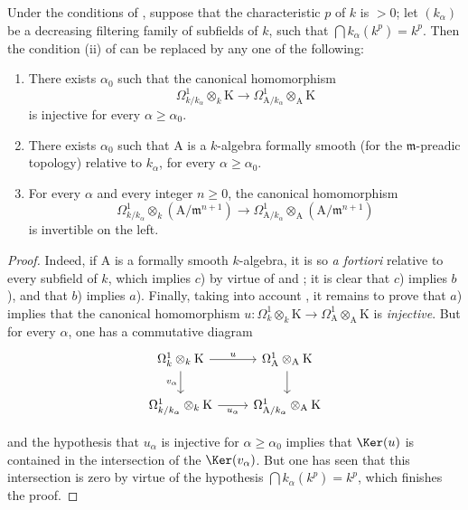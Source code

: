 \begin{proposition}[22.2.8]
\label{0.22.2.8}
Under the conditions of , suppose that the characteristic $p$ of $k$ is $>0$; let $(k_\alpha)$ be a decreasing filtering family of subfields of $k$, such that $\bigcap k_\alpha(k^p)=k^p$.
Then the condition (ii) of  can be replaced by any one of the following:
\begin{enumerate}
  \item[a)] There exists $\alpha_0$ such that the canonical homomorphism
  \[
    \Omega^1_{k/k_\alpha}\otimes_k\mathrm{K}\to\Omega^1_{\mathrm{A}/k_\alpha}\otimes_\mathrm{A}\mathrm{K}
  \]
  is injective for every $\alpha\geq\alpha_0$.
  \item[b)] There exists $\alpha_0$ such that $\mathrm{A}$ is a $k$-algebra formally smooth (for the $\mathfrak{m}$-preadic topology) relative to $k_\alpha$, for every $\alpha\geq\alpha_0$.
  \item[c)] For every $\alpha$ and every integer $n\geq 0$, the canonical homomorphism
  \[
    \Omega^1_{k/k_\alpha}\otimes_k(\mathrm{A}/\mathfrak{m}^{n+1})\to\Omega^1_{\mathrm{A}/k_\alpha}\otimes_\mathrm{A}(\mathrm{A}/\mathfrak{m}^{n+1})
  \]
  is invertible on the left.
\end{enumerate}
\end{proposition}

\begin{proof}
Indeed, if $\mathrm{A}$ is a formally smooth $k$-algebra, it is so \emph{a fortiori} relative to every subfield of $k$, which implies $c$) by virtue of  and ; it is clear that $c$) implies $b$), and that $b$) implies $a$).
Finally, taking into account , it remains to prove that $a$) implies that the canonical homomorphism $u:\Omega^1_k\otimes_k\mathrm{K}\to\Omega^1_\mathrm{A}\otimes_\mathrm{A}\mathrm{K}$ is \emph{injective}.
But for every $\alpha$, one has a commutative diagram
\[
  \begin{tikzcd}
    \Omega^1_k\otimes_k\mathrm{K} \ar[r,"u"] \ar[d,"v_\alpha"'] & \Omega^1_\mathrm{A}\otimes_\mathrm{A}\mathrm{K} \ar[d]\\
    \Omega^1_{k/k_\alpha}\otimes_k\mathrm{K} \ar[r,"u_\alpha"'] & \Omega^1_{\mathrm{A}/k_\alpha}\otimes_\mathrm{A}\mathrm{K}
  \end{tikzcd}
\]


and the hypothesis that $u_\alpha$ is injective for $\alpha\geq\alpha_0$ implies that $\Ker(u)$ is contained in the intersection of the $\Ker(v_\alpha)$.
But one has seen  that this intersection is zero by virtue of the hypothesis $\bigcap k_\alpha(k^p)=k^p$, which finishes the proof.
\end{proof}

